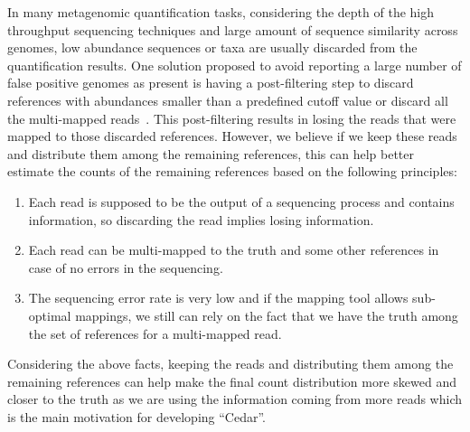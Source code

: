 In many metagenomic quantification tasks,
considering the depth of the high throughput sequencing techniques
and large amount of sequence similarity across genomes,
low abundance sequences or taxa are usually discarded from the quantification results.
One solution proposed to avoid reporting a large number of false positive genomes as present
is having a post-filtering step
to discard references with abundances smaller than a predefined cutoff value
or discard all the multi-mapped reads~\cite{lu2017bracken,reppell2018using}.
This post-filtering results in losing the reads that were mapped to those discarded references.
However, we believe if we keep these reads and distribute them among the remaining references,
this can help better estimate the counts of the remaining references
based on the following principles:
\begin{enumerate}
    \item Each read is supposed to be the output of a sequencing process and contains information,
    so discarding the read implies losing information.
    \item Each read can be multi-mapped to the truth and some other references
    in case of no errors in the sequencing.
    \item The sequencing error rate is very low and if the mapping tool allows sub-optimal mappings,
    we still can rely on the fact that we have the truth
    among the set of references for a multi-mapped read.
\end{enumerate}

Considering the above facts, keeping the reads and
distributing them among the remaining references
can help make the final count distribution more skewed and closer to the truth
as we are using the information coming from more reads
which is the main motivation for developing ``Cedar''.

